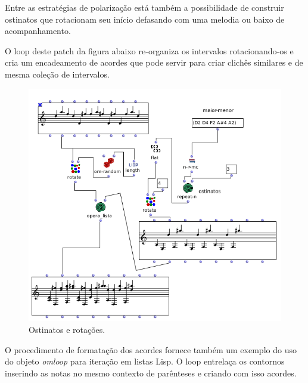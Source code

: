 \documentclass[
	12pt,				%
	openright,			%
	twoside,			%
	a4paper,			%
	english,			%
	french,				%
	spanish,			%
	brazil				%
	]{abntex2}
\begin{document}
Entre as estratégias de polarização está também a possibilidade de construir ostinatos que rotacionam seu início defasando com uma melodia ou baixo de acompanhamento. 

O loop deste patch da figura abaixo re-organiza os intervalos rotacionando-os e cria um encadeamento de acordes que pode servir para criar clichês similares e de mesma coleção de intervalos.


\begin{figure}[!h]
	\caption{\label{fig_grafico}Ostinatos e rotações. }
	\begin{center}
	    \includegraphics[scale=0.5]{OMPD/motivicos01.png}
	\end{center}
\end{figure}

O procedimento de formatação dos acordes fornece também um exemplo do uso do objeto \textit{omloop} para iteração em listas Lisp. O loop entrelaça os contornos inserindo as notas no mesmo contexto de parênteses e criando com isso acordes.
\end{document}
